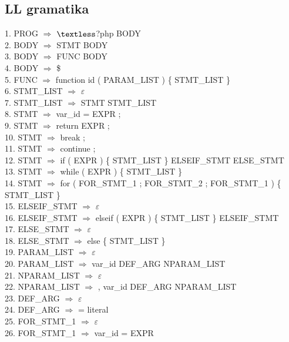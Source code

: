 \documentclass[12pt,a4paper,titlepage,final]{article}
\begin{document}
\subsection{LL gramatika}
1. PROG $\Rightarrow$ $\textless$?php BODY\\
2. BODY $\Rightarrow$ STMT BODY\\
3. BODY $\Rightarrow$ FUNC BODY\\
4. BODY $\Rightarrow$ \$\\
5. FUNC $\Rightarrow$ function id ( PARAM\_LIST ) \{ STMT\_LIST \}\\
6. STMT\_LIST $\Rightarrow$ $\varepsilon$\\
7. STMT\_LIST $\Rightarrow$ STMT STMT\_LIST\\
8. STMT $\Rightarrow$ var\_id = EXPR ;\\
9. STMT $\Rightarrow$ return EXPR ;\\
10. STMT $\Rightarrow$ break ;\\
11. STMT $\Rightarrow$ continue ;\\
12. STMT $\Rightarrow$ if ( EXPR ) \{ STMT\_LIST \} ELSEIF\_STMT ELSE\_STMT\\
13. STMT $\Rightarrow$ while ( EXPR ) \{ STMT\_LIST \}\\
14. STMT $\Rightarrow$ for ( FOR\_STMT\_1 ; FOR\_STMT\_2 ; FOR\_STMT\_1 ) \{ STMT\_LIST \}\\
15. ELSEIF\_STMT $\Rightarrow$ $\varepsilon$\\
16. ELSEIF\_STMT $\Rightarrow$ elseif ( EXPR ) \{ STMT\_LIST \} ELSEIF\_STMT\\
17. ELSE\_STMT $\Rightarrow$ $\varepsilon$\\
18. ELSE\_STMT $\Rightarrow$ else \{ STMT\_LIST \}\\
19. PARAM\_LIST $\Rightarrow$ $\varepsilon$\\
20. PARAM\_LIST $\Rightarrow$ var\_id DEF\_ARG NPARAM\_LIST\\
21. NPARAM\_LIST $\Rightarrow$ $\varepsilon$\\
22. NPARAM\_LIST $\Rightarrow$ , var\_id DEF\_ARG NPARAM\_LIST\\
23. DEF\_ARG $\Rightarrow$ $\varepsilon$\\
24. DEF\_ARG $\Rightarrow$ = literal\\
25. FOR\_STMT\_1 $\Rightarrow$ $\varepsilon$\\
26. FOR\_STMT\_1 $\Rightarrow$ var\_id = EXPR\\
\end{document}
